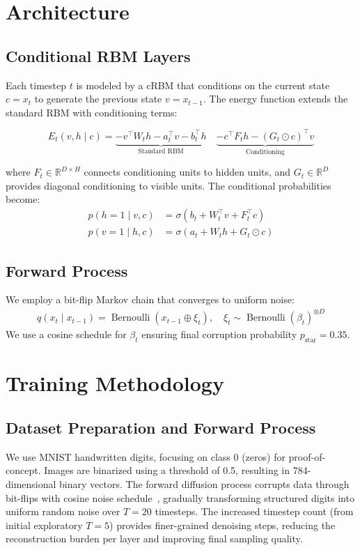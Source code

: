 \documentclass[11pt]{article}
\begin{document}
\section{Architecture}

\subsection{Conditional RBM Layers}

Each timestep $t$ is modeled by a cRBM that conditions on the current state $c = x_t$ to generate the previous state $v = x_{t-1}$. The energy function extends the standard RBM with conditioning terms:

$$
E_t(v, h \mid c) = \underbrace{- v^\top W_t h - a_t^\top v - b_t^\top h}_{\text{Standard RBM}} \quad \underbrace{- c^\top F_t h - (G_t \odot c)^\top v}_{\text{Conditioning}}
$$

where $F_t \in \mathbb{R}^{D \times H}$ connects conditioning units to hidden units, and $G_t \in \mathbb{R}^{D}$ provides diagonal conditioning to visible units. The conditional probabilities become:
\begin{align}
p(h=1\mid v,c) &= \sigma(b_t + W_t^\top v + F_t^\top c) \\
p(v=1\mid h,c) &= \sigma(a_t + W_t h + G_t \odot c)
\end{align}

\subsection{Forward Process}

We employ a bit-flip Markov chain that converges to uniform noise:
\begin{align}
q(x_t \mid x_{t-1}) = \operatorname{Bernoulli}(x_{t-1} \oplus \xi_t), \quad \xi_t \sim \operatorname{Bernoulli}(\beta_t)^{\otimes D}
\end{align}
We use a cosine schedule for $\beta_t$ ensuring final corruption probability $p_{\text{star}} = 0.35$.

\section{Training Methodology}

\subsection{Dataset Preparation and Forward Process}
We use MNIST handwritten digits, focusing on class 0 (zeros) for proof-of-concept. Images are binarized using a threshold of 0.5, resulting in 784-dimensional binary vectors. The forward diffusion process corrupts data through bit-flips with cosine noise schedule~\cite{ho2020}, gradually transforming structured digits into uniform random noise over $T=20$ timesteps. The increased timestep count (from initial exploratory $T=5$) provides finer-grained denoising steps, reducing the reconstruction burden per layer and improving final sampling quality.
\end{document}
